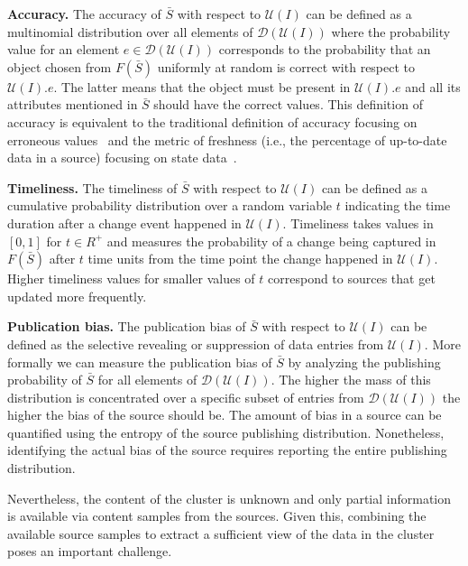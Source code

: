 \documentclass{sig-alternate}
\begin{document}
\vspace{3pt}\noindent\textbf{Accuracy.} The accuracy of $\bar{S}$ with respect to $\mathcal{U}(I)$ can be defined as a multinomial distribution over all elements of  $\mathcal{D}(\mathcal{U}(I))$ where the probability value for an element $e \in \mathcal{D}(\mathcal{U}(I))$ corresponds to the probability that an object chosen from $F(\bar{S})$ uniformly at random is correct with respect to $\mathcal{U}(I).e$. The latter means that the object must be present in $\mathcal{U}(I).e$ and all its attributes mentioned in $\bar{S}$ should have the correct values. This definition of accuracy is equivalent to the traditional definition of accuracy focusing on erroneous values~\cite{dong:vldb13} and the metric of freshness (i.e., the percentage of up-to-date data in a source) focusing on state data~\cite{rekatsinas:2014}.

\vspace{3pt}\noindent\textbf{Timeliness.} The timeliness of $\bar{S}$ with respect to $\mathcal{U}(I)$ can be defined as a cumulative probability distribution over a random variable $t$ indicating the time duration after a change event happened in $\mathcal{U}(I)$. Timeliness takes values in $[0,1]$ for $t \in R^+$ and measures the probability of a change being captured in $F(\bar{S})$ after $t$ time units from the time point the change happened in $\mathcal{U}(I)$. Higher timeliness values for smaller values of $t$ correspond to sources that get updated more frequently.

\vspace{3pt}\noindent\textbf{Publication bias.} The publication bias of $\bar{S}$ with respect to $\mathcal{U}(I)$ can be defined as the selective revealing or suppression of data entries from $\mathcal{U}(I)$. More formally we can measure the publication bias of $\bar{S}$ by analyzing the publishing probability of $\bar{S}$ for all elements of $\mathcal{D}(\mathcal{U}(I))$. The higher the mass of this distribution is concentrated over a specific subset of entries from $\mathcal{D}(\mathcal{U}(I))$ the higher the bias of the source should be. The amount of bias in a source can be quantified using the entropy of the source publishing distribution. Nonetheless, identifying the actual bias of the source requires reporting the entire publishing distribution.

\vspace{3pt} Nevertheless, the content of the cluster is unknown and only partial information is available via content samples from the sources. Given this,  combining the available source samples to extract a sufficient view of the data in the cluster poses an important challenge. 
\end{document}
